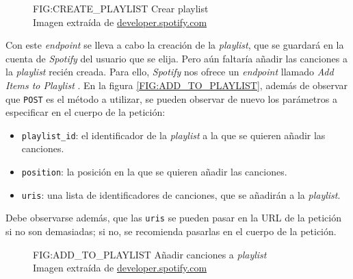 \begin{figure}[Crear playlist]{FIG:CREATE_PLAYLIST}
    {Crear playlist \\
    {\scriptsize Imagen extraída de \href{https://developer.spotify.com/documentation/web-api/reference/create-playlist}{developer.spotify.com}}}
\end{figure}

Con este \textit{endpoint} se lleva a cabo la creación de la \textit{playlist}, que se guardará en la cuenta de \textit{Spotify} del usuario que
se elija. Pero aún faltaría añadir las canciones a la \textit{playlist} recién creada. Para ello, \textit{Spotify} nos ofrece un \textit{endpoint} llamado
\textit{Add Items to Playlist} \cite{add_to_playlist}. En la figura \ref{FIG:ADD_TO_PLAYLIST}, además de observar que \texttt{POST} es el método a utilizar,
se pueden observar de nuevo los parámetros a especificar en el cuerpo de la petición:

\begin{itemize}
  \item \texttt{playlist\_id}: el identificador de la \textit{playlist} a la que se quieren añadir las canciones.
  \item \texttt{position}: la posición en la que se quieren añadir las canciones.
  \item \texttt{uris}: una lista de identificadores de canciones, que se añadirán a la \textit{playlist}.
\end{itemize}

Debe observarse además, que las \texttt{uris} se pueden pasar en la URL de la petición si no son demasiadas;
si no, se recomienda pasarlas en el cuerpo de la petición.

\begin{figure}[Añadir canciones a \textit{playlist}]{FIG:ADD_TO_PLAYLIST}
    {Añadir canciones a \textit{playlist} \\
    {\scriptsize Imagen extraída de \href{https://developer.spotify.com/documentation/web-api/reference/add-tracks-to-playlist}{developer.spotify.com}}}
\end{figure}
